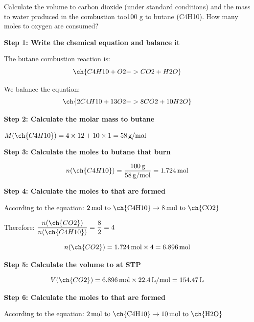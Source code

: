 \begin{exercise}
    Calculate the volume to carbon dioxide (under standard conditions) and the mass to water produced in the combustion too100 g to butane (C4H10).
    How many moles to oxygen are consumed?
    \begin{solu}
        \textbf{Step 1: Write the chemical equation and balance it}

        The butane combustion reaction is:
        \begin{equation*}
            \ch{C4H10 + O2 -> CO2 + H2O}
        \end{equation*}

        We balance the equation:
        \begin{equation*}
            \ch{2 C4H10 + 13 O2 -> 8 CO2 + 10 H2O}
        \end{equation*}

        \textbf{Step 2: Calculate the molar mass to butane}

        $M(\ch{C4H10}) = 4 \times 12 + 10 \times 1 = 58\,\text{g/mol}$

        \textbf{Step 3: Calculate the moles to butane that burn}

        \begin{equation*}
            n(\ch{C4H10}) = \frac{100\,\text{g}}{58\,\text{g/mol}} = 1.724\,\text{mol}
        \end{equation*}

        \textbf{Step 4: Calculate the moles to  that are formed}

        According to the equation: $2\,\text{mol to \ch{C4H10}} \rightarrow 8\,\text{mol to \ch{CO2}}$

        Therefore: $\dfrac{n(\ch{CO2})}{n(\ch{C4H10})} = \dfrac{8}{2} = 4$

        \begin{equation*}
            n(\ch{CO2}) = 1.724\,\text{mol} \times 4 = 6.896\,\text{mol}
        \end{equation*}

        \textbf{Step 5: Calculate the volume to  at STP}

        \begin{equation*}
            V(\ch{CO2}) = 6.896\,\text{mol} \times 22.4\,\text{L/mol} = 154.47\,\text{L}
        \end{equation*}

        \textbf{Step 6: Calculate the moles to  that are formed}

        According to the equation: $2\,\text{mol to \ch{C4H10}} \rightarrow 10\,\text{mol to \ch{H2O}}$


\end{solu}
\end{exercise}

